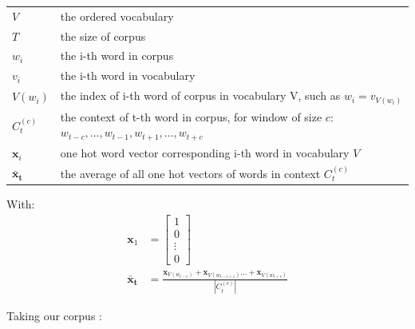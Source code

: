 {\ttfamily
\begin{table}[H]
    \centering
    \begin{tabular}{ll}
        \toprule
        $V$       	   	 &    the ordered vocabulary \\
        $T$    		   	 &    the size of corpus \\
        $w_i$          	 &    the i-th word in corpus \\
        $v_{i}$          	 &    the i-th word in vocabulary \\
        $V(w_i)$       &    the index of i-th word of corpus in vocabulary V, such as $ w_{i} = v_{V(w_i)}$\\
        $C_t^{(c)}$      &    the context of t-th word in corpus, for window of size $c$: $w_{t-c}, ..., w_{t-1}, w_{t+1}, ... ,w_{t+c}$\\
		$\mathbf{x}_i$ 				& one hot word vector corresponding i-th word in vocabulary $V$ \\
        $\mathbf{\bar x_t}$ 	& the average of all one hot vectors of words in context $C_t^{(c)}$ \\
        \bottomrule
    \end{tabular}
\end{table}
}

With:
\begin{align}
	\mathbf{x}_1 &= 
	\begin{bmatrix} 
		1 \\
		0 \\
		\vdots\\
		0
	\end{bmatrix} \\
	\mathbf{\bar x_t} &= \frac{\mathbf{x}_{V(w_{t-c})} + \mathbf{x}_{V(w_{t-c+1})} ... + \mathbf{x}_{V(w_{t+c})}}{|C_t^{(c)}|}
\end{align}

Taking our corpus :

